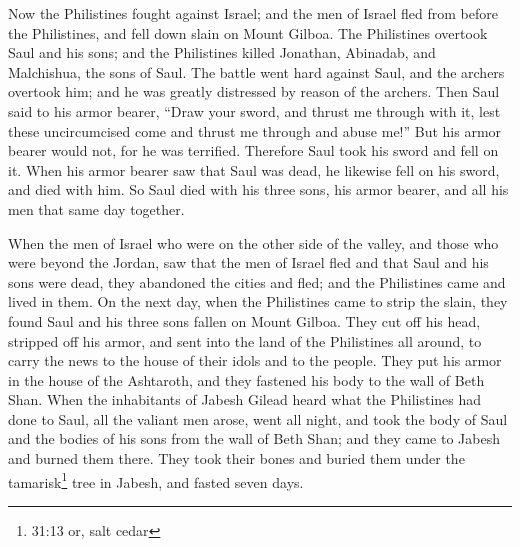 \mychapter{} \myverse*{}Now the Philistines fought against Israel; and the men of Israel
fled from before the Philistines, and fell down slain on Mount Gilboa.
\myverse{}The Philistines overtook Saul and his sons; and the Philistines killed Jonathan,
Abinadab, and Malchishua, the sons of Saul.
\myverse{}The battle went hard against Saul, and the archers overtook him; and he was
greatly distressed by reason of the archers.
\myverse{}Then Saul said to his armor bearer, “Draw your sword, and thrust me through
with it, lest these uncircumcised come and thrust me through and abuse me!” But his armor bearer would
not, for he was terrified. Therefore Saul took his sword and fell on it.
\myverse{}When his armor bearer saw that Saul was dead, he likewise fell on his sword,
and died with him.
\myverse{}So Saul died with his three sons, his armor bearer, and all his men that same
day together.

\myverse{}When the men of Israel who were on the other side of the valley,
and those who were beyond the Jordan, saw that the men of Israel fled and that Saul and his sons were
dead, they abandoned the cities and fled; and the Philistines came and lived in them.
\myverse{}On the next day, when the Philistines came to strip the slain, they found Saul
and his three sons fallen on Mount Gilboa.
\myverse{}They cut off his head, stripped off his armor, and sent into the land of the
Philistines all around, to carry the news to the house of their idols and to the people.
\myverse{}They put his armor in the house of the Ashtaroth, and they fastened his body
to the wall of Beth Shan.
\myverse{}When the inhabitants of Jabesh Gilead heard what the Philistines had done
to Saul,
\myverse{}all the valiant men arose, went all night, and took the body of Saul and
the bodies of his sons from the wall of Beth Shan; and they came to Jabesh and burned them there.
\myverse{}They took their bones and buried them under the tamarisk\footnote{31:13 or, salt cedar} tree in Jabesh, and fasted seven days.


